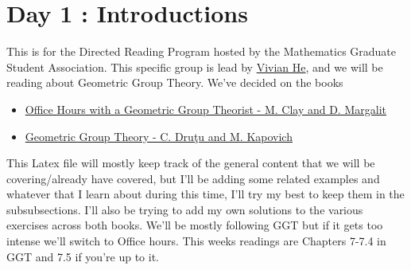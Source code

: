 \section{Day 1 : Introductions}
This is for the Directed Reading Program hosted by the Mathematics Graduate Student Association. This specific group is lead by \href{https://www.math.toronto.edu/vivianhe/Home.html}{Vivian He}, and we will be reading about Geometric Group Theory. We've decided on the books
\begin{itemize}
    \item \href{https://press.princeton.edu/books/paperback/9780691158662/office-hours-with-a-geometric-group-theorist}{Office Hours with a Geometric Group Theorist - M. Clay and D. Margalit}
    \item\href{https://www.math.ucdavis.edu/~kapovich/EPR/ggt.pdf}{Geometric Group Theory - C. Druţu and M. Kapovich}
\end{itemize}
This Latex file will mostly keep track of the general content that we will be covering/already have covered, but I'll be adding some related examples and whatever that I learn about during this time, I'll try my best to keep them in the subsubsections. I'll also be trying to add my own solutions to the various exercises across both books.
We'll be mostly following GGT but if it gets too intense we'll switch to Office hours. This weeks readings are Chapters 7-7.4 in GGT and 7.5 if you're up to it.